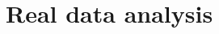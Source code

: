 \documentclass[a4paper 12pt]{article}
\numberwithin{equation}{section}
\begin{document}
\section{Real data analysis}
\label{secAP:realdataanalysis}
\end{document}
